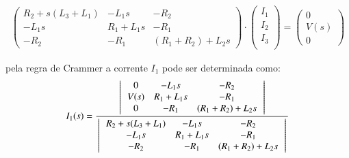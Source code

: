 \documentclass[a4paper,11pt]{article}
\begin{document}
 \begin{eqnarray}
       \left( \begin{array}{ccc}
    R_2 + s(L_3 + L_1) & -L_1s & -R_2 \\
    -L_1s & R_1 + L_1s & -R_1 \\
    -R_2 & -R_1 & (R_1 + R_2) + L_2s
    \end{array}\right)
    \cdot
    \left( \begin{array}{l}
    I_1 \\
    I_2 \\
    I_3 \\
    \end{array}\right)
    =
     \left( \begin{array}{l}
      0 \\
      V(s) \\
      0    
     \end{array}\right)
 \end{eqnarray}
 
 pela regra de Crammer a corrente $I_1$ pode ser determinada como:
 \begin{equation}
   I_1(s) = \frac
        {
        \left\arrowvert  \begin{array}{ccc}
    0 & -L_1s & -R_2 \\
    V(s) & R_1 + L_1s & -R_1 \\
    0 & -R_1 & (R_1 + R_2) + L_2s
    \end{array}\right\arrowvert 
        }
        {
        \left\arrowvert  \begin{array}{ccc}
    R_2 + s(L_3 + L_1) & -L_1s & -R_2 \\
    -L_1s & R_1 + L_1s & -R_1 \\
    -R_2 & -R_1 & (R_1 + R_2) + L_2s
    \end{array}\right\arrowvert 
        }
  \label{eq:crammerI1}
 \end{equation}
 
\end{document}
